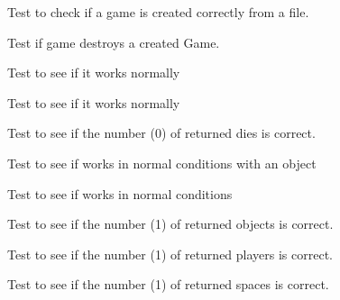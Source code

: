 \begin{DoxyRefList}
\item[\label{test__test000028}%
\hypertarget{test__test000028}{}%
Member \hyperlink{game__test_8h_a867d2e7bebdfa55ee8b8a73764c46f5b}{test1\+\_\+game\+\_\+create\+\_\+from\+\_\+file} ()]Test to check if a game is created correctly from a file.  
\item[\label{test__test000034}%
\hypertarget{test__test000034}{}%
Member \hyperlink{game__test_8h_abb9b53b5dbd1f36a9518e11c0a0bee16}{test1\+\_\+game\+\_\+destroy} ()]Test if game destroys a created Game.  
\item[\label{test__test000067}%
\hypertarget{test__test000067}{}%
Member \hyperlink{game__test_8h_a6c4aa8df2680e65915e1c9b687164028}{test1\+\_\+game\+\_\+find} ()]Test to see if it works normally  
\item[\label{test__test000070}%
\hypertarget{test__test000070}{}%
Member \hyperlink{game__test_8h_acf41e567400a66fca3a2c1224aa44de9}{test1\+\_\+game\+\_\+find\+\_\+name} ()]Test to see if it works normally  
\item[\label{test__test000065}%
\hypertarget{test__test000065}{}%
Member \hyperlink{game__test_8h_a7d3e65d6960a38ca883d0591a679f9c4}{test1\+\_\+game\+\_\+get\+\_\+dies\+\_\+number} ()]Test to see if the number (0) of returned dies is correct.  
\item[\label{test__test000082}%
\hypertarget{test__test000082}{}%
Member \hyperlink{game__test_8h_a979cf97b28d14da099d77631877101ef}{test1\+\_\+game\+\_\+get\+\_\+last\+\_\+check} ()]Test to see if works in normal conditions with an object  
\item[\label{test__test000078}%
\hypertarget{test__test000078}{}%
Member \hyperlink{game__test_8h_adffc2120d97aef04f9387431397defbc}{test1\+\_\+game\+\_\+get\+\_\+last\+\_\+command} ()]Test to see if works in normal conditions  
\item[\label{test__test000061}%
\hypertarget{test__test000061}{}%
Member \hyperlink{game__test_8h_a1649f86f3414e97a09b230bae2b9911b}{test1\+\_\+game\+\_\+get\+\_\+objects\+\_\+number} ()]Test to see if the number (1) of returned objects is correct.  
\item[\label{test__test000057}%
\hypertarget{test__test000057}{}%
Member \hyperlink{game__test_8h_af8bec2d2267ab511ba4c3d0a3fa46622}{test1\+\_\+game\+\_\+get\+\_\+players\+\_\+number} ()]Test to see if the number (1) of returned players is correct.  
\item[\label{test__test000053}%
\hypertarget{test__test000053}{}%
Member \hyperlink{game__test_8h_ab8c2b4ef2ac2319b3d039e3775f6ce34}{test1\+\_\+game\+\_\+get\+\_\+spaces\+\_\+number} ()]Test to see if the number (1) of returned spaces is correct.  

\end{DoxyRefList}
